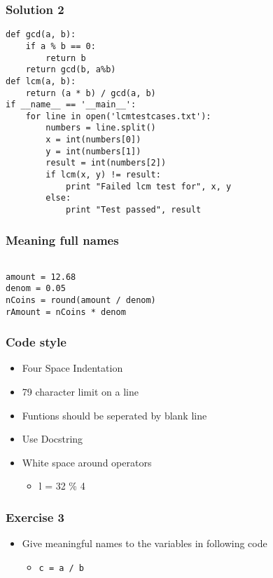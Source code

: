 \documentclass[17pt,compress]{beamer}
\begin{document}
\begin{frame}[fragile]
\frametitle{Solution 2}
\label{sec-11}

\lstset{language=Python}
\begin{scriptsize}
\begin{lstlisting}
def gcd(a, b):
    if a % b == 0: 
        return b
    return gcd(b, a%b)
def lcm(a, b):
    return (a * b) / gcd(a, b)
if __name__ == '__main__':
    for line in open('lcmtestcases.txt'):
        numbers = line.split()
        x = int(numbers[0])
        y = int(numbers[1])
        result = int(numbers[2])
        if lcm(x, y) != result:
            print "Failed lcm test for", x, y
        else:
            print "Test passed", result
\end{lstlisting}
\end{scriptsize}
\end{frame}
\begin{frame}[fragile]
\frametitle{Meaning full names}
\label{sec-12}

\lstset{language=Python}
\begin{lstlisting}

amount = 12.68
denom = 0.05
nCoins = round(amount / denom)
rAmount = nCoins * denom
\end{lstlisting}
\end{frame}
\begin{frame}
\frametitle{Code style}
\label{sec-13}

\begin{itemize}
\item Four Space Indentation\pause
\item 79 character limit on a line\pause
\item Funtions should be seperated by 
   blank line\pause
\item Use Docstring\pause
\item White space around operators
	\begin{itemize}
	\item l = 32 \% 4
	\end{itemize}
\end{itemize}
\end{frame}
\begin{frame}
\frametitle{Exercise 3}
\label{sec-14}

\begin{itemize}
\item Give meaningful names to the variables in following
     code
	\begin{itemize}
	\item \texttt{c = a / b}
	\end{itemize}
\end{itemize}
\end{frame}
\end{document}
